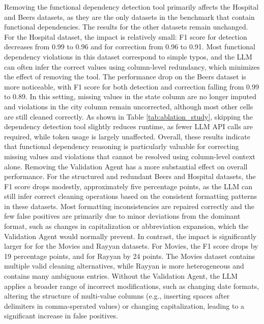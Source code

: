 Removing the functional dependency detection tool primarily affects the Hospital and Beers datasets, as they are the only datasets in the benchmark that contain functional dependencies. 
The results for the other datasets remain unchanged.
For the Hospital dataset, the impact is relatively small: F1 score for detection decreases from 0.99 to 0.96 and for correction from 0.96 to 0.91. 
Most functional dependency violations in this dataset correspond to simple typos, and the LLM can often infer the correct values using column-level redundancy, which minimizes the effect of removing the tool. 
The performance drop on the Beers dataset is more noticeable, with F1 score for both detection and correction falling from 0.99 to 0.89. 
In this setting, missing values in the state column are no longer imputed and violations in the city column remain uncorrected, although most other cells are still cleaned correctly. 
As shown in Table \ref{tab:ablation_study}, skipping the dependency detection tool slightly reduces runtime, as fewer LLM API calls are required, while token usage is largely unaffected. 
Overall, these results indicate that functional dependency reasoning is particularly valuable for correcting missing values and violations that cannot be resolved using column-level context alone.
\newline\newline
Removing the Validation Agent has a more substantial effect on overall performance. 
For the structured and redundant Beers and Hospital datasets, the F1 score drops modestly, approximately five percentage points, as the LLM can still infer correct cleaning operations based on the consistent formatting patterns in these datasets. 
Most formatting inconsistencies are repaired correctly and the few false positives are primarily due to minor deviations from the dominant format, such as changes in capitalization or abbreviation expansion, which the Validation Agent would normally prevent. 
In contrast, the impact is significantly larger for for the Movies and Rayyan datasets.
For Movies, the F1 score drops by 19 percentage points, and for Rayyan by 24 points. 
The Movies dataset contains multiple valid cleaning alternatives, while Rayyan is more heterogeneous and contains many ambiguous entries. 
Without the Validation Agent, the LLM applies a broader range of incorrect modifications, such as changing date formats, altering the structure of multi-value columns (e.g., inserting spaces after delimiters in comma-sperated values) or changing capitalization, leading to a significant increase in false positives. 
